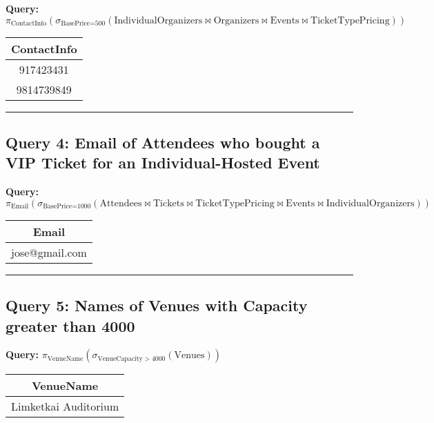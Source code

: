 \documentclass{article}
\begin{document}
\noindent \textbf{Query:} $\pi_{\text{ContactInfo}} \left( \sigma_{\text{BasePrice=500}} \left( \text{IndividualOrganizers} \bowtie \text{Organizers} \bowtie \text{Events} \bowtie \text{TicketTypePricing} \right) \right)$

\begin{center}
\begin{tabular}{c}
\toprule
\textbf{ContactInfo} \\
\midrule
917423431 \\
9814739849 \\
\bottomrule
\end{tabular}
\end{center}

\hrule

\subsection*{Query 4: Email of Attendees who bought a VIP Ticket for an Individual-Hosted Event}

\noindent \textbf{Query:} $\pi_{\text{Email}} \left( \sigma_{\text{BasePrice=1000}} \left( \text{Attendees} \bowtie \text{Tickets} \bowtie \text{TicketTypePricing} \bowtie \text{Events} \bowtie \text{IndividualOrganizers} \right) \right)$

\begin{center}
\begin{tabular}{c}
\toprule
\textbf{Email} \\
\midrule
jose@gmail.com \\
\bottomrule
\end{tabular}
\end{center}

\hrule

\subsection*{Query 5: Names of Venues with Capacity greater than 4000}

\noindent \textbf{Query:} $\pi_{\text{VenueName}} \left( \sigma_{\text{VenueCapacity} > 4000} (\text{Venues}) \right)$

\begin{center}
\begin{tabular}{c}
\toprule
\textbf{VenueName} \\
\midrule
Limketkai Auditorium \\
\bottomrule
\end{tabular}
\end{center}
\end{document}
